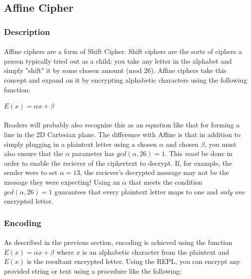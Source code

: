 \documentclass[12pt,a4paper]{article}
\begin{document}

\subsection{Affine Cipher}
\subsubsection{Description}
\paragraph{}
Affine ciphers are a form of Shift Cipher.  Shift ciphers are the sorts of 
ciphers a person typically tried out as a child:  you take any letter in the 
alphabet and simply "shift" it by some chosen amount (mod 26).  Affine ciphers 
take this concept and expand on it by encrypting alphabetic characters using 
the following function:

$E(x) = \alpha x + \beta$

\paragraph{}
Readers will probably also recognize this as an equation like that for forming 
a line in the 2D Cartesian plane.  The difference with Affine is that in addition 
to simply plugging in a plaintext letter using a chosen $\alpha$ and chosen 
$\beta$, you must also ensure that the $\alpha$ parameter has 
$gcd(\alpha,26) = 1$.  This \textit{must} be done in order to enable the 
reciever of the ciphertext to decrypt.  If, for example, the sender were to 
set $\alpha = 13$, the reciever's decrypted message may not be the message they 
were expecting!  Using an $\alpha$ that meets the condition 
$gcd(\alpha,26) = 1$ guarantees that every plaintext letter maps to one and 
\textit{only one} encrypted letter.

\subsubsection{Encoding}
\paragraph{}
As described in the previous section, encoding is achieved using the function 
$E(x) = \alpha x + \beta$ where $x$ is an alphabetic character from the 
plaintext and $E(x)$ is the resultant encrypted letter.  Using the REPL, you 
can encrypt any provided string or text using a procedure like the following:
\end{document}
